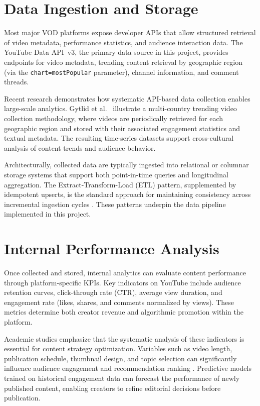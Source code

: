 \documentclass[ENG]{TFUOC}
\begin{document}
\section{Data Ingestion and Storage}

Most major VOD platforms expose developer APIs that allow structured retrieval of video metadata, performance statistics, and audience interaction data. The YouTube Data API~v3, the primary data source in this project, provides endpoints for video metadata, trending content retrieval by geographic region (via the \texttt{chart=mostPopular} parameter), channel information, and comment threads.

Recent research demonstrates how systematic API-based data collection enables large-scale analytics. Gytlid et al.\ \cite{gytlid2025} illustrate a multi-country trending video collection methodology, where videos are periodically retrieved for each geographic region and stored with their associated engagement statistics and textual metadata. The resulting time-series datasets support cross-cultural analysis of content trends and audience behavior.

Architecturally, collected data are typically ingested into relational or columnar storage systems that support both point-in-time queries and longitudinal aggregation. The Extract-Transform-Load (ETL) pattern, supplemented by idempotent upserts, is the standard approach for maintaining consistency across incremental ingestion cycles \cite{vod_bigdata}. These patterns underpin the data pipeline implemented in this project.

\section{Internal Performance Analysis}

Once collected and stored, internal analytics can evaluate content performance through platform-specific KPIs. Key indicators on YouTube include audience retention curves, click-through rate (CTR), average view duration, and engagement rate (likes, shares, and comments normalized by views). These metrics determine both creator revenue and algorithmic promotion within the platform.

Academic studies emphasize that the systematic analysis of these indicators is essential for content strategy optimization. Variables such as video length, publication schedule, thumbnail design, and topic selection can significantly influence audience engagement and recommendation ranking \cite{vod_bigdata}. Predictive models trained on historical engagement data can forecast the performance of newly published content, enabling creators to refine editorial decisions before publication.
\end{document}
